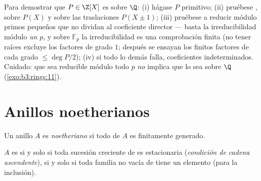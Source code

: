 \begin{method}\label{met:b3:rings:irreducibility}
Para demostrar que $P \in \Z[X]$ es
 sobre $\Q$: (i) hágase
$P$ primitivo; (ii) pruébese ,
sobre $P(X)$ y sobre las traslaciones $P(X \pm
1)$; (iii) pruébese a reducir módulo primos pequeños que no dividan al
coeficiente director --- basta la irreducibilidad módulo \emph{un} $p$,
y sobre $\mathbb F_p$ la irreducibilidad es una comprobación finita (no
tener raíces excluye los factores de grado $1$; después se ensayan los
finitos factores de cada grado $\leq \deg P/2$); (iv) si todo lo demás
falla, coeficientes indeterminados. Cuidado: que sea reducible módulo
todo $p$ \emph{no} implica que lo sea sobre $\Q$
(\cref{exo:b3:rings:11}).
\end{method}

\section{Anillos noetherianos}

\begin{definition}\label{def:b3:rings:noetherian}
Un anillo $A$ es \emph{noetheriano} si todo
 de $A$ es finitamente generado.
\end{definition}

\begin{proposition}\label{prop:b3:rings:noethacc}
$A$ es  si y solo si toda
sucesión creciente de  es
estacionaria (\emph{condición de cadena ascendente}), si y solo si toda
familia no vacía de  tiene un
elemento  (para la
inclusión).
\end{proposition}

